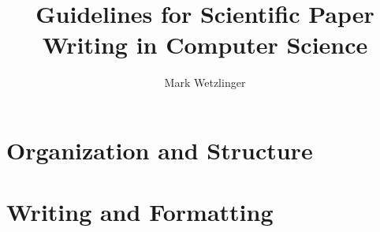 \documentclass[a5paper,openany]{book}
\title{\huge Guidelines for Scientific Paper Writing in Computer Science}
\author{\Large Mark Wetzlinger}
\date{}
\begin{document}
\frontmatter

\maketitle




\tableofcontents

\mainmatter




\part{Organization and Structure}











\part{Writing and Formatting}









\backmatter


\printbibliography
\end{document}
